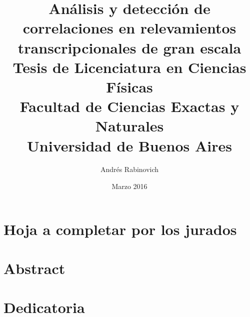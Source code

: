 \documentclass[12pt]{report}
\title{
	{\large Análisis y detección de correlaciones en relevamientos transcripcionales de gran escala}\\
    {Tesis de Licenciatura en Ciencias Físicas}\\
	{\large Facultad de Ciencias Exactas y Naturales}\\
	{\large Universidad de Buenos Aires}
}
\author{Andrés Rabinovich}
\date{Marzo 2016}
\newcommand{\paginaenblanco}{\clearpage\mbox{}\newpage}
\begin{document}
\maketitle
\paginaenblanco
\chapter*{Hoja a completar por los jurados}
\paginaenblanco

\paginaenblanco
\chapter*{Abstract}
\paginaenblanco
\chapter*{Dedicatoria}
\paginaenblanco

\tableofcontents











\clearpage


\end{document}
